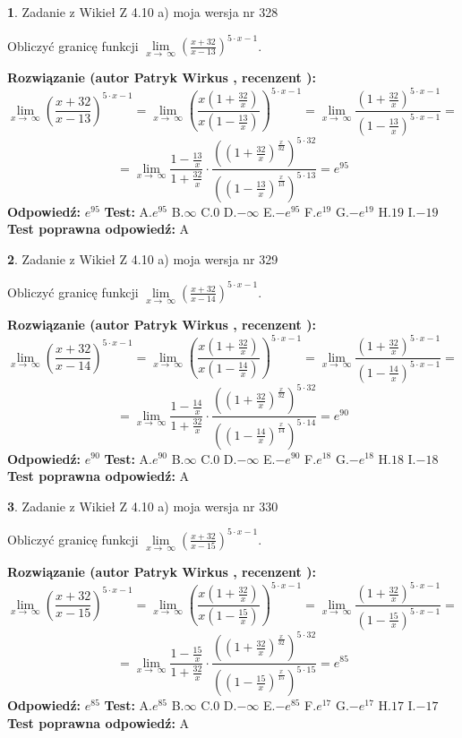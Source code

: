 \documentclass[12pt, a4paper]{article}
\theoremstyle{definition} %
\newtheorem{zad}{}
\newcommand{\zadStart}[1]{\begin{zad}#1\newline}
\newcommand{\zadStop}{\end{zad}}
\newcommand{\rozwStart}[2]{\noindent \textbf{Rozwiązanie (autor #1 , recenzent #2): }\newline}
\newcommand{\rozwStop}{\newline}
\newcommand{\odpStart}{\noindent \textbf{Odpowiedź:}\newline}
\newcommand{\odpStop}{\newline}
\newcommand{\testStart}{\noindent \textbf{Test:}\newline}
\newcommand{\testStop}{\newline}
\newcommand{\kluczStart}{\noindent \textbf{Test poprawna odpowiedź:}\newline}
\newcommand{\kluczStop}{\newline}
\begin{document}
\zadStart{Zadanie z Wikieł Z 4.10 a) moja wersja nr 328}

Obliczyć granicę funkcji  $\lim\limits_{x\to\ \infty}(\frac{x+32}{x-13})^{5\cdot x-1}$.
\zadStop
\rozwStart{Patryk Wirkus}{}
$$\lim\limits_{x\to\ \infty}(\frac{x+32}{x-13})^{5\cdot x-1} = \lim\limits_{x\to\ \infty}(\frac{x(1+\frac{32}{x})}{x(1-\frac{13}{x})})^{5\cdot x-1}=\lim\limits_{x\to\ \infty}\frac{(1+\frac{32}{x})^{5\cdot x-1}}{(1-\frac{13}{x})^{5\cdot x-1}}=$$
$$=\lim\limits_{x\to\ \infty}\frac{1-\frac{13}{x}}{1+\frac{32}{x}}\cdot\frac{((1+\frac{32}{x})^{\frac{x}{32}})^{5\cdot32}}{((1-\frac{13}{x})^{\frac{x}{13}})^{5\cdot13}}=e^{95}$$
\rozwStop
\odpStart
$e^{95}$
\odpStop
\testStart
A.$e^{95}$ B.$\infty$ C.$0$ D.$-\infty$ E.$-e^{95}$
F.$e^{19}$ G.$-e^{19}$
H.$19$
I.$-19$
\testStop
\kluczStart
A
\kluczStop



\zadStart{Zadanie z Wikieł Z 4.10 a) moja wersja nr 329}

Obliczyć granicę funkcji  $\lim\limits_{x\to\ \infty}(\frac{x+32}{x-14})^{5\cdot x-1}$.
\zadStop
\rozwStart{Patryk Wirkus}{}
$$\lim\limits_{x\to\ \infty}(\frac{x+32}{x-14})^{5\cdot x-1} = \lim\limits_{x\to\ \infty}(\frac{x(1+\frac{32}{x})}{x(1-\frac{14}{x})})^{5\cdot x-1}=\lim\limits_{x\to\ \infty}\frac{(1+\frac{32}{x})^{5\cdot x-1}}{(1-\frac{14}{x})^{5\cdot x-1}}=$$
$$=\lim\limits_{x\to\ \infty}\frac{1-\frac{14}{x}}{1+\frac{32}{x}}\cdot\frac{((1+\frac{32}{x})^{\frac{x}{32}})^{5\cdot32}}{((1-\frac{14}{x})^{\frac{x}{14}})^{5\cdot14}}=e^{90}$$
\rozwStop
\odpStart
$e^{90}$
\odpStop
\testStart
A.$e^{90}$ B.$\infty$ C.$0$ D.$-\infty$ E.$-e^{90}$
F.$e^{18}$ G.$-e^{18}$
H.$18$
I.$-18$
\testStop
\kluczStart
A
\kluczStop



\zadStart{Zadanie z Wikieł Z 4.10 a) moja wersja nr 330}

Obliczyć granicę funkcji  $\lim\limits_{x\to\ \infty}(\frac{x+32}{x-15})^{5\cdot x-1}$.
\zadStop
\rozwStart{Patryk Wirkus}{}
$$\lim\limits_{x\to\ \infty}(\frac{x+32}{x-15})^{5\cdot x-1} = \lim\limits_{x\to\ \infty}(\frac{x(1+\frac{32}{x})}{x(1-\frac{15}{x})})^{5\cdot x-1}=\lim\limits_{x\to\ \infty}\frac{(1+\frac{32}{x})^{5\cdot x-1}}{(1-\frac{15}{x})^{5\cdot x-1}}=$$
$$=\lim\limits_{x\to\ \infty}\frac{1-\frac{15}{x}}{1+\frac{32}{x}}\cdot\frac{((1+\frac{32}{x})^{\frac{x}{32}})^{5\cdot32}}{((1-\frac{15}{x})^{\frac{x}{15}})^{5\cdot15}}=e^{85}$$
\rozwStop
\odpStart
$e^{85}$
\odpStop
\testStart
A.$e^{85}$ B.$\infty$ C.$0$ D.$-\infty$ E.$-e^{85}$
F.$e^{17}$ G.$-e^{17}$
H.$17$
I.$-17$
\testStop
\kluczStart
A
\kluczStop
\end{document}
